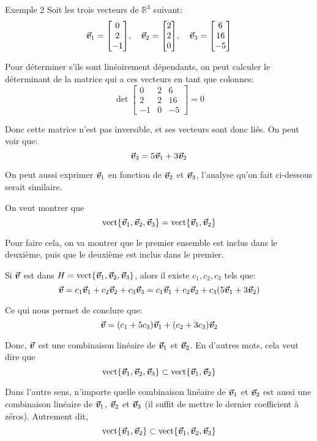 \documentclass[a4paper]{article}
\begin{document}
\begin{parag}{Exemple 2}
    Soit les trois vecteurs de $\mathbb{R}^3$ suivant:
    \[\bvec{v}_1 = \begin{bmatrix} 0 \\ 2 \\ -1 \end{bmatrix}, \mathspace \bvec{v}_2 = \begin{bmatrix} 2 \\ 2 \\ 0 \end{bmatrix}, \mathspace \bvec{v}_3 = \begin{bmatrix} 6 \\ 16 \\ -5 \end{bmatrix} \]

    Pour déterminer s'ils sont linéairement dépendants, on peut calculer le déterminant de la matrice qui a ces vecteurs en tant que colonnes:
    \[\det\begin{bmatrix} 0 & 2 & 6 \\ 2 & 2 & 16 \\ -1 & 0 & -5 \end{bmatrix} = 0\]

    Donc cette matrice n'est pas inversible, et ses vecteurs sont donc liés. On peut voir que:
    \[\bm{\protect\vec{v}}_3 = 5\bm{\protect\vec{v}}_1 + 3\bm{\protect\vec{v}}_2\]

    On peut aussi exprimer $\bm{\protect\vec{v}}_1$ en fonction de $\bm{\protect\vec{v}}_2$ et $\bm{\protect\vec{v}}_3$, l'analyse qu'on fait ci-dessous serait similaire.

    On veut montrer que
    \[\vect\left\{\bvec{v}_1, \bvec{v}_2, \bvec{v}_3\right\} = \vect\left\{\bvec{v}_1, \bvec{v}_2\right\}\]

    Pour faire cela, on va montrer que le premier ensemble est inclus dans le deuxième, puis que le deuxième est inclus dans le premier.

    Si $\bm{\protect\vec{v}}$ est dans $H = \vect\left\{\bvec{v}_1, \bvec{v}_2, \bvec{v}_3\right\}$, alors il existe $c_1, c_2, c_3$ tels que:
    \[\bvec{v} = c_1 \bvec{v}_1 + c_2 \bvec{v}_2 + c_3 \bvec{v}_3 = c_1 \bvec{v}_1 + c_2 \bvec{v}_2 + c_3\left(5 \bvec{v}_1 + 3 \bvec{v}_2\right)\]

    Ce qui nous permet de conclure que:
    \[\bvec{v} = \left(c_1 + 5c_3\right)\bvec{v}_1 + \left(c_2 + 3c_3\right)\bvec{v}_2\]

    Donc, $\bm{\protect\vec{v}}$ est une combinaison linéaire de $\bm{\protect\vec{v}}_1$ et $\bm{\protect\vec{v}}_2$. En d'autres mots, cela veut dire que
    \[\vect\left\{\bvec{v}_1, \bvec{v}_2, \bvec{v}_3\right\} \subset \vect\left\{\bvec{v}_1, \bvec{v}_2\right\}\]

    Dans l'autre sens, n'importe quelle combinaison linéaire de $\bm{\protect\vec{v}}_1$ et $\bm{\protect\vec{v}}_2$ est aussi une combinaison linéaire de $\bm{\protect\vec{v}}_1$, $\bm{\protect\vec{v}}_2$ et $\bm{\protect\vec{v}}_3$ (il suffit de mettre le dernier coefficient à zéros). Autrement dit,
    \[\vect\left\{\bvec{v}_1, \bvec{v}_2\right\} \subset \vect\left\{\bvec{v}_1, \bvec{v}_2, \bvec{v}_3\right\}\]

\end{parag}
\end{document}
